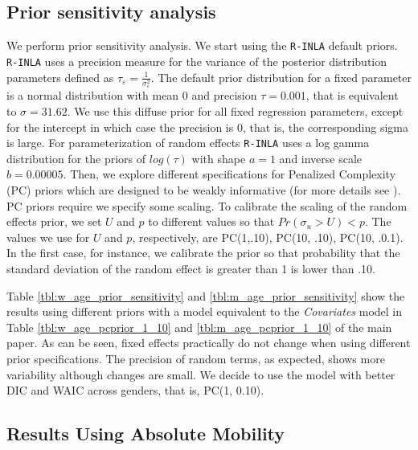 \documentclass[11pt]{article}
\begin{document}
\newpage
\subsection{Prior sensitivity analysis}\label{sec:sensitivity}


We perform prior sensitivity analysis. We start using the \texttt{R-INLA} default priors. \texttt{R-INLA} uses a precision measure for the variance of the posterior distribution parameters defined as $\tau_{\varepsilon} = \frac{1}{ \sigma^2_{\varepsilon} }$. The default prior distribution for a fixed parameter is a normal distribution with mean 0 and precision $\tau = 0.001$, that is equivalent to $\sigma = 31.62$. We use this diffuse prior  for all fixed regression parameters, except for the intercept in which case the precision is 0, that is, the corresponding sigma is large. For parameterization of random effects \texttt{R-INLA} uses a log gamma distribution for the priors of $log(\tau)$ with shape $a = 1$ and inverse scale $b = 0.00005$. Then, we explore different specifications for Penalized Complexity (PC) priors which are designed to be weakly informative (for more details see \cite{Simpson2017}). PC priors require we specify some scaling. To calibrate the scaling of the random effects prior, we set $U$ and $p$ to different values so that $Pr(\sigma_u > U) < p$. The values we use for $U$ and $p$, respectively, are PC(1,.10), PC(10, .10), PC(10, .0.1). In the first case, for instance, we calibrate the prior so that probability that the standard deviation of the random effect is greater than 1 is lower than .10. 

Table \ref{tbl:w_age_prior_sensitivity} and \ref{tbl:m_age_prior_sensitivity} show the results using different priors with a model equivalent to the \textit{Covariates} model in Table \ref{tbl:w_age_pcprior_1_10} and \ref{tbl:m_age_pcprior_1_10} of the main paper. As can be seen, fixed effects practically do not change when using different prior specifications. The precision of random terms, as expected, shows more variability although changes are small. We decide to use the model with better DIC and WAIC across genders, that is, PC(1, 0.10). 





\clearpage
\subsection{Results Using Absolute Mobility}
\end{document}
